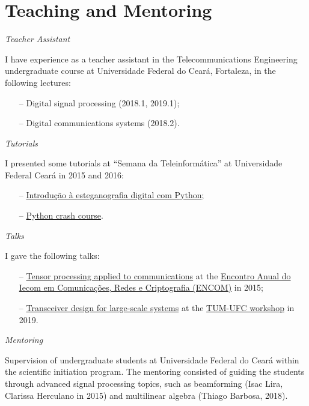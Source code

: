 \section{Teaching and Mentoring}

{\sl Teacher Assistant} 

I have experience as a teacher assistant in the Telecommunications Engineering undergraduate course at Universidade Federal do Cear\'a, Fortaleza, in the following lectures:
\begin{itemize}
	\item[--] Digital signal processing (2018.1, 2019.1);
	\item[--] Digital communications systems (2018.2).
\end{itemize}

{\sl Tutorials}

I presented some tutorials at ``Semana da Teleinformática'' at Universidade Federal Cear\'a in 2015 and 2016:
\begin{itemize}
	\item[--] \href{https://github.com/lnribeiro/setic2015/blob/master/esteganografia.ipynb}{Introdução à esteganografia digital com Python};
	\item[--] \href{https://github.com/lnribeiro/setic2015/blob/master/intropython.ipynb}{Python crash course}.
\end{itemize}

{\sl Talks}

I gave the following talks:
\begin{itemize}
	\item[--] \href{https://github.com/lnribeiro/lnribeiro.github.io/blob/master/assets/pdf/encom15.pdf}{Tensor processing applied to communications} at the \href{https://iecom.org.br/encom2015/#}{Encontro Anual do Iecom em Comunicaç\~{o}es, Redes e Criptografia (ENCOM)} in 2015;
	\item[--] \href{http://lnribeiro.github.io/assets/pdf/tum19.pdf}{Transceiver design for large-scale systems} at the \href{http://www.msv.ei.tum.de/workshop-tum-ufc/}{TUM-UFC workshop} in 2019.
\end{itemize}

{\sl Mentoring}

Supervision of undergraduate students at Universidade Federal do Cear\'a within the scientific initiation program. The mentoring consisted of guiding the students through advanced signal processing topics, such as beamforming (Isac Lira, Clarissa Herculano in 2015) and multilinear algebra (Thiago Barbosa, 2018).